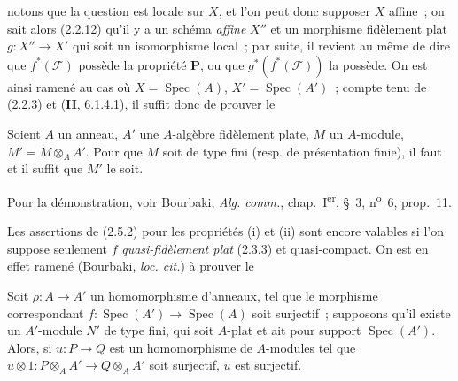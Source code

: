 notons que la question est locale sur $X$, et l'on peut donc supposer $X$
affine~; on sait alors (2.2.12) qu'il y a un schéma \emph{affine} $X''$ et un
morphisme fidèlement plat $g:X''\to X'$ qui soit un isomorphisme local~; par
suite, il revient au même de dire que $f^*(\mathscr F)$ possède la propriété
$\boldsymbol{P}$, ou que $g^*(f^*(\mathscr F))$ la possède. On est ainsi ramené au
cas où $X=\operatorname{Spec}(A)$, $X'=\operatorname{Spec}(A')$~; compte tenu
de (2.2.3) et (\textbf{II}, 6.1.4.1), il suffit donc de prouver le

\begin{lemma}[2.5.3]
\label{IV.2.5.3-fr}
Soient $A$ un anneau, $A'$ une $A$-algèbre fidèlement plate, $M$ un
$A$-module, $M'=M\otimes_A A'$. Pour que $M$ soit de type fini \textup{(resp.} de
présentation finie), il faut et il suffit que $M'$ le soit.
\end{lemma}

Pour la démonstration, voir Bourbaki, \emph{Alg. comm.},
chap.~I\textsuperscript{er}, \S~3, n\textsuperscript{o}~6, prop.~11.

\begin{remark}[2.5.4]
\label{IV.2.5.4-fr}
Les assertions de (2.5.2) pour les propriétés (i) et (ii) sont encore
valables si l'on suppose seulement $f$ \emph{quasi-fidèlement plat} (2.3.3) et
quasi-compact. On est en effet ramené (Bourbaki, \emph{loc. cit.}) à prouver
le
\end{remark}

\begin{lemma}[2.5.4.1]
\label{IV.2.5.4.1-fr}
Soit $\rho:A\to A'$ un homomorphisme d'anneaux, tel que le morphisme
correspondant $f:\operatorname{Spec}(A')\to\operatorname{Spec}(A)$ soit
surjectif~; supposons qu'il existe un $A'$-module $N'$ de type fini, qui soit
$A$-plat et ait pour support $\operatorname{Spec}(A')$. Alors, si
$u:P\to Q$ est un homomorphisme de $A$-modules tel que
$u\otimes 1:P\otimes_A A'\longrightarrow Q\otimes_A A'$
soit surjectif, $u$ est surjectif.
\end{lemma}

